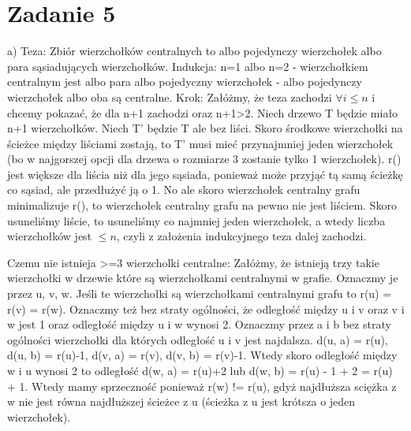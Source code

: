 \documentclass[12pt]{article}
\begin{document}
\section{Zadanie 5} 
a) Teza: Zbiór wierzchołków centralnych to albo pojedynczy wierzchołek albo para sąsiadujących wierzchołków.
Indukcja:
n=1 albo n=2 - wierzchołkiem centralnym jest albo para albo pojedyczny wierzchołek - albo pojedynczy wierzchołek albo oba są centralne.
Krok:
Załóżmy, że teza zachodzi $\forall i \leq n$ i chcemy pokazać, że dla n+1 zachodzi oraz n+1>2.
Niech drzewo T będzie miało n+1 wierzchołków. Niech T' będzie T ale bez liści. Skoro środkowe wierzchołki na ścieżce między liściami zostają, to T' musi mieć przynajmniej jeden wierzchołek (bo w najgorszej opcji dla drzewa o rozmiarze 3 zostanie tylko 1 wierzchołek). r() jest większe dla liścia niż dla jego sąsiada, ponieważ może przyjąć tą samą ścieżkę co sąsiad, ale przedłużyć ją o 1. No ale skoro wierzchołek centralny grafu minimalizuje r(), to wierzchołek centralny grafu na pewno nie jest liściem. Skoro usuneliśmy liście, to usuneliśmy co najmniej jeden wierzchołek, a wtedy liczba wierzchołków jest $\leq n$, czyli z założenia indukcyjnego teza dalej zachodzi.

Czemu nie istnieja >=3 wierzcholki centralne:
Załóżmy, że istnieją trzy takie wierzchołki w drzewie które są wierzchołkami centralnymi w grafie. Oznaczmy je przez u, v, w.
Jeśli te wierzchołki są wierzchołkami centralnymi grafu to r(u) = r(v) = r(w). Oznaczmy też bez straty ogólności, że odległość między u i v oraz v i w jest 1 oraz odległość między u i w wynosi 2. Oznaczmy przez a i b bez straty ogólności wierzchołki dla których odległość u i v jest najdalsza. d(u, a) = r(u), d(u, b) = r(u)-1, d(v, a) = r(v), d(v, b) = r(v)-1. Wtedy skoro odległość między w i u wynosi 2 to odległość d(w, a) = r(u)+2 lub d(w, b) = r(u) - 1 + 2 = r(u) + 1. Wtedy mamy sprzeczność ponieważ r(w) != r(u), gdyż najdłuższa sciężka z w nie jest równa najdłuższej ścieżce z u (ścieżka z u jest krótsza o jeden wierzchołek).
\end{document}
